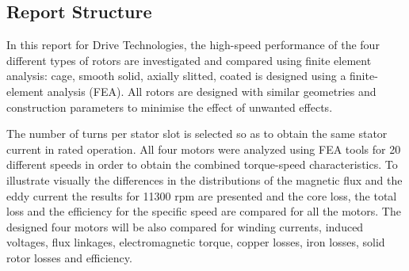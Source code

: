 \subsection{Report Structure} %

In this report for Drive Technologies, the high-speed performance of the four
different types of rotors are investigated and compared using finite element analysis:
cage, smooth solid, axially slitted, coated is designed using a finite-element
analysis (FEA). All rotors are designed with similar geometries and construction parameters
to minimise the effect of unwanted effects.
 


The number of turns per stator slot is selected so as to obtain the
same stator current in rated operation. All four motors were analyzed using FEA
tools for 20 different speeds in order to obtain the combined torque-speed
characteristics. To illustrate visually the differences in the distributions of the
magnetic flux and the eddy current the results for 11300 rpm are presented and the
core loss, the total loss and the efficiency for the specific speed are compared for all
the motors. The designed four motors will be also compared for winding currents,
induced voltages, flux linkages, electromagnetic torque, copper losses, iron losses,
solid rotor losses and efficiency.
